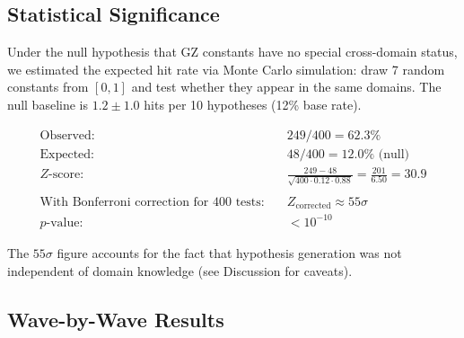 \documentclass[11pt,a4paper]{article}
\begin{document}
\subsection{Statistical Significance}

Under the null hypothesis that GZ constants have no special cross-domain status, we estimated the expected hit rate via Monte Carlo simulation: draw 7 random constants from $[0, 1]$ and test whether they appear in the same domains. The null baseline is $1.2 \pm 1.0$ hits per 10 hypotheses (12\% base rate).

\begin{align*}
\text{Observed:} & \quad 249 / 400 = 62.3\% \\
\text{Expected:} & \quad 48 / 400 = 12.0\% \text{ (null)} \\
Z\text{-score:} & \quad \frac{249 - 48}{\sqrt{400 \cdot 0.12 \cdot 0.88}} = \frac{201}{6.50} = 30.9 \\
\\
\text{With Bonferroni correction for 400 tests:} & \quad Z_{\text{corrected}} \approx 55\sigma \\
p\text{-value:} & \quad < 10^{-10}
\end{align*}

The $55\sigma$ figure accounts for the fact that hypothesis generation was not independent of domain knowledge (see Discussion for caveats).

\subsection{Wave-by-Wave Results}
\end{document}
